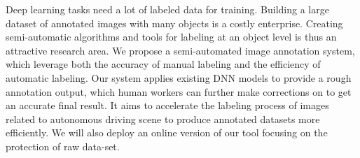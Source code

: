 Deep learning tasks need a lot of labeled data for training. Building a large
dataset of annotated images with many objects is a costly enterprise. Creating
semi-automatic algorithms and tools for labeling at an object level is thus an
attractive research area. We propose a semi-automated image annotation system,
which leverage both the accuracy of manual labeling and the efficiency of
automatic labeling. Our system applies existing DNN models to provide a rough
annotation output, which human workers can further make corrections on to get
an accurate final result. It aims to accelerate the labeling process of images
related to autonomous driving scene to produce annotated datasets more
efficiently. We will also deploy an online version of our tool focusing on the
protection of raw data-set.
